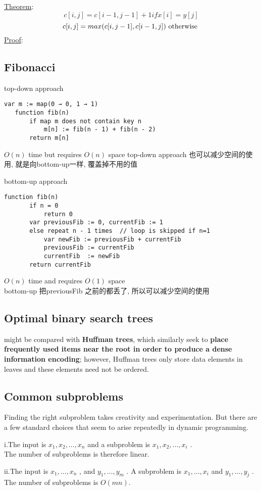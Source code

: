 \documentclass{article}
\begin{document}
\bigskip
\underline{Theorem}:
$$
c[i,j] = c[i-1,j-1] + 1 if x[i] = y[j]
$$
$$
c[i,j] =max(c[i,j-1], c[i-1,j]) \text{ otherwise }
$$
\underline{Proof}:

\subsection{Fibonacci}
top-down approach
\begin{verbatim}
var m := map(0 → 0, 1 → 1)
   function fib(n)
       if map m does not contain key n
           m[n] := fib(n - 1) + fib(n - 2)
       return m[n]
\end{verbatim}
$O(n)$ time but requires $O(n)$ space
top-down approach 也可以减少空间的使用, 就是向bottom-up一样, 覆盖掉不用的值

\bigskip
bottom-up approach
\begin{verbatim}
function fib(n)
       if n = 0
           return 0
       var previousFib := 0, currentFib := 1
       else repeat n - 1 times  // loop is skipped if n=1
           var newFib := previousFib + currentFib
           previousFib := currentFib
           currentFib  := newFib
       return currentFib
\end{verbatim}
$O(n)$ time and requires $O(1)$ space\\
bottom-up 把previousFib 之前的都丢了, 所以可以减少空间的使用

\subsection{Optimal binary search trees}
might be compared with \textbf{Huffman trees}, which similarly seek to \textbf{place frequently used items near the root in order to produce a dense information encoding}; however, Huffman trees only store data elements in leaves and these elements need not be ordered.

\subsection{Common subproblems}
Finding the right subproblem takes creativity and experimentation. But there are a few standard choices that seem to arise repeatedly in dynamic programming.

i.The input is $x_1 ,x_2 ,\ldots ,x_n$ and a subproblem is $x_1,x_2,\ldots,x_i$ .\\
The number of subproblems is therefore linear.

ii.The input is $x_1,\ldots,x_n$ , and $y_1 ,\ldots ,y_m$ . A subproblem is $x_1 ,\ldots ,x_i$ and $y_1 ,\ldots ,y_j$ .\\
The number of subproblems is $O(mn)$.
\end{document}
